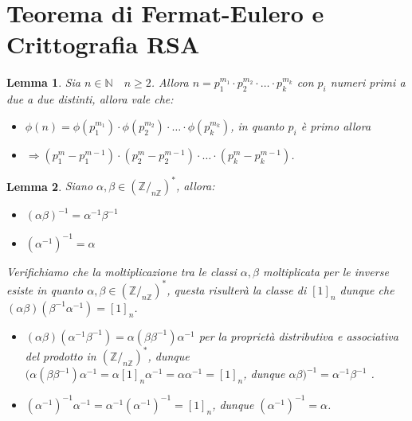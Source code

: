 \documentclass{article}
\makeatletter
\renewenvironment{proof}[1][\proofname]{\par
    \pushQED{\qed}%
    \normalfont \topsep6\p@\@plus6\p@\relax
    \trivlist
    \item\relax
    {\itshape
    #1\@addpunct{.}}\hspace\labelsep\ignorespaces
    }{%
    \popQED\endtrivlist\@endpefalse
}
\newtheorem{lemma}{Lemma}[theorem]
\theoremstyle{definition}
\newcommand{\Z}{\mathbb{Z}}
\newcommand{\N}{\mathbb{N}}
\makeatother
\begin{document}
\part{Teorema di Fermat-Eulero e Crittografia RSA}
\begin{lemma}
    Sia \(n\in\N\quad n\geq 2\).
    Allora \(n=p_1^{m_1}\cdot p_2^{m_2}\cdot\ldots\cdot p_k^{m_k}\) con \(p_i\) numeri primi a due a due distinti, allora vale che:
    \begin{itemize} 
        \item \(\phi(n)=\phi(p_1^{m_1})\cdot\phi(p_2^{m_2})\cdot\ldots\cdot\phi(p_k^{m_k})\), in quanto \(p_i\) è primo allora 
        \item \(\Rightarrow(p_1^{m}-p_1^{m-1})\cdot(p_2^{m}-p_2^{m-1})\cdot\ldots\cdot(p_k^{m}-p_k^{m-1})\). 
    \end{itemize}
\end{lemma}
\begin{lemma}
    Siano \(\alpha,\beta\in(\Z/_{n\Z})^*\), allora:
    \begin{itemize}
        \item \((\alpha\beta)^{-1}=\alpha^{-1}\beta^{-1}\)
        \item \((\alpha^{-1})^{-1}=\alpha\)
    \end{itemize}
    \begin{proof}
        Verifichiamo che la moltiplicazione tra le classi \(\alpha,\beta\) moltiplicata per le inverse esiste in quanto \(\alpha,\beta\in(\Z/_{n\Z})^*\), questa risulterà la classe di \([1]_n\) dunque che \((\alpha\beta)(\beta^{-1}\alpha^{-1})=[1]_n\).
        \begin{itemize}
            \item \((\alpha\beta)(\alpha^{-1}\beta^{-1})=\alpha(\beta\beta^{-1})\alpha^{-1}\) per la proprietà distributiva e associativa del prodotto in \((\Z/_{n\Z})^*\), dunque \((\alpha(\beta\beta^{-1})\alpha^{-1}=\alpha[1]_n\alpha^{-1}=\alpha\alpha^{-1}=[1]_n\), dunque \(\alpha\beta)^{-1}=\alpha^{-1}\beta^{-1}\) \checkmark.
            \item \((\alpha^{-1})^{-1}\alpha^{-1}=\alpha^{-1}(\alpha^{-1})^{-1}=[1]_n\), dunque \((\alpha^{-1})^{-1}=\alpha\).
        \end{itemize}
    \end{proof}
\end{lemma}
\end{document}
